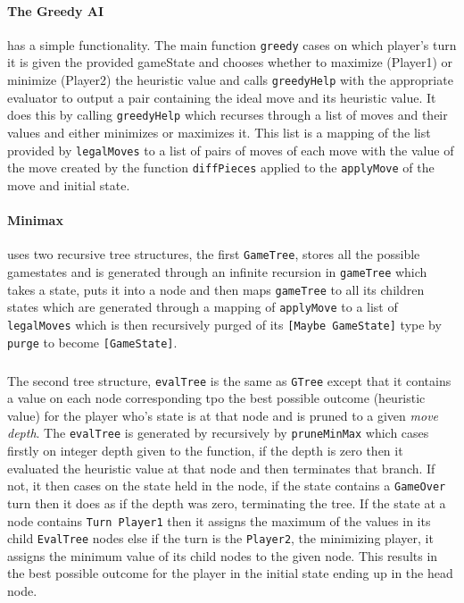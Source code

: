 \documentclass[11pt]{article}
\begin{document}
\paragraph{The Greedy AI} has a simple functionality. The main function \verb|greedy| cases on which player's turn it is given the provided gameState and chooses whether to maximize (Player1) or minimize (Player2) the heuristic value and calls \verb|greedyHelp| with the appropriate evaluator to output a pair containing the ideal move and its heuristic value. It does this by calling \verb|greedyHelp| which recurses through a list of moves and their values and either minimizes or maximizes it. This list is a mapping of the list provided by \verb|legalMoves| to a list of pairs of moves of each move with the value of the move created by the function \verb|diffPieces| applied to the \verb|applyMove| of the move and initial state.

\paragraph{Minimax} uses two recursive tree structures, the first \verb|GameTree|, stores all the possible gamestates and is generated through an infinite recursion in \verb|gameTree| which takes a state, puts it into a node and then maps \verb|gameTree| to all its children states which are generated through a mapping of \verb|applyMove| to a list of \verb|legalMoves| which is then recursively purged of its \verb|[Maybe GameState]| type by \verb|purge| to become \verb|[GameState]|.

\subparagraph*{}The second tree structure, \verb|evalTree| is the same as \verb|GTree| except that it contains a value on each node corresponding tpo the best possible outcome (heuristic value) for the player who's state is at that node and is pruned to a given \textit{move depth}. The \verb|evalTree| is generated by recursively by \verb|pruneMinMax| which cases firstly on integer depth given to the function, if the depth is zero then it evaluated the heuristic value at that node and then terminates that branch. If not, it then cases on the state held in the node, if the state contains a \verb|GameOver| turn then it does as if the depth was zero, terminating the tree. If the state at a node contains \verb|Turn Player1| then it assigns the maximum of the values in its child \verb|EvalTree| nodes else if the turn is the \verb|Player2|, the minimizing player, it assigns the minimum value of its child nodes to the given node. This results in the best possible outcome for the player in the initial state ending up in the head node.
\end{document}
